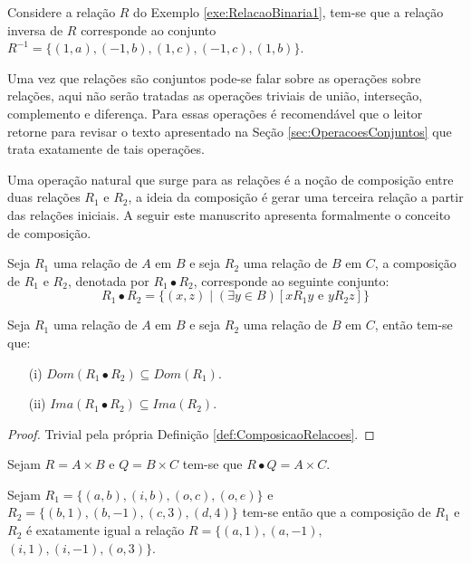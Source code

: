 \begin{example}
	Considere a relação $R$ do Exemplo \ref{exe:RelacaoBinaria1}, tem-se que a relação inversa de $R$ corresponde ao conjunto $R^{-1} = \{(1, a), (-1, b), (1, c), (-1, c), (1, b)\}$.
\end{example}

Uma vez que relações são conjuntos pode-se falar sobre as operações sobre relações, aqui não serão tratadas as operações triviais de união, interseção, complemento e diferença. Para essas operações é recomendável que o leitor retorne para revisar o texto apresentado na Seção \ref{sec:OperacoesConjuntos} que trata exatamente de tais operações. 

Uma operação natural que surge para as relações é a noção de composição entre duas relações $R_1$ e $R_2$, a ideia da composição é gerar uma terceira relação a partir das relações iniciais. A seguir este manuscrito apresenta formalmente o conceito de composição.

\begin{definition}\label{def:ComposicaoRelacoes}
	Seja $R_1$ uma relação de $A$ em $B$ e seja $R_2$ uma relação de $B$ em $C$, a composição de $R_1$ e $R_2$, denotada por $R_1 \bullet R_2$, corresponde ao seguinte conjunto:
	$$R_1 \bullet R_2 = \{(x, z) \mid (\exists y \in B)[x\mathrel{R_1}y \text{ e } y\mathrel{R_2}z] \}$$ 
\end{definition}

\begin{proposition}
	Seja $R_1$ uma relação de $A$ em $B$ e seja $R_2$ uma relação de $B$ em $C$, então tem-se que:
	\begin{itemize}
		\item[(i)] $Dom(R_1 \bullet R_2) \subseteq Dom(R_1)$.
		\item[(ii)] $Ima(R_1 \bullet R_2) \subseteq Ima(R_2)$.
	\end{itemize}
\end{proposition}

\begin{proof}
	Trivial pela própria Definição \ref{def:ComposicaoRelacoes}.
\end{proof}

\begin{example}
	Sejam $R = A \times B$ e $Q = B \times C$ tem-se que $R \bullet Q = A \times C$.
\end{example}

\begin{example}
	Sejam $R_1 = \{(a, b), (i, b), (o, c), (o, e)\}$ e $R_2 = \{(b, 1), (b, -1), (c, 3), (d, 4)\}$ tem-se então que a composição de $R_1$ e $R_2$ é exatamente igual a relação $R = \{(a, 1), (a, -1),$ $(i, 1), (i, -1), (o, 3)\}$.
\end{example}

